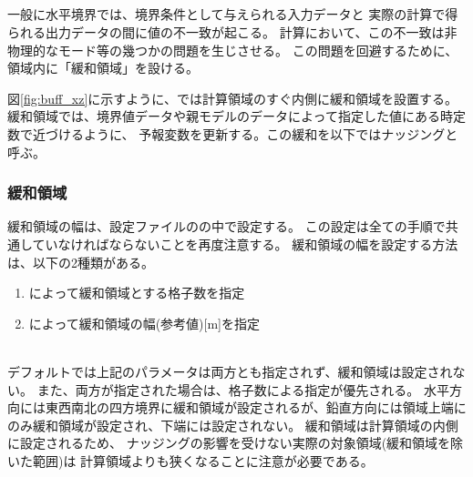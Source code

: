 

\subsection{\SubsecBasicBufferSetting} \label{subsec:buffer}

一般に水平境界では、境界条件として与えられる入力データと
実際の計算で得られる出力データの間に値の不一致が起こる。
計算において、この不一致は非物理的なモード等の幾つかの問題を生じさせる。
この問題を回避するために、領域内に「緩和領域」を設ける。

図\ref{fig:buff_xz}に示すように、\scalerm では計算領域のすぐ内側に緩和領域を設置する。
緩和領域では、境界値データや親モデルのデータによって指定した値にある時定数で近づけるように、
予報変数を更新する。この緩和を以下ではナッジングと呼ぶ。

\subsubsection{緩和領域}
緩和領域の幅は、設定ファイルのの中で設定する。
この設定は全ての手順で共通していなければならないことを再度注意する。
緩和領域の幅を設定する方法は、以下の2種類がある。
\begin{enumerate}
\item {} によって緩和領域とする格子数を指定\\
\item {} によって緩和領域の幅(参考値)[m]を指定\\\
\end{enumerate}
デフォルトでは上記のパラメータは両方とも指定されず、緩和領域は設定されない。
また、両方が指定された場合は、格子数による指定が優先される。
水平方向には東西南北の四方境界に緩和領域が設定されるが、鉛直方向には領域上端にのみ緩和領域が設定され、下端には設定されない。
緩和領域は計算領域の内側に設定されるため、
ナッジングの影響を受けない実際の対象領域(緩和領域を除いた範囲)は
計算領域よりも狭くなることに注意が必要である。

